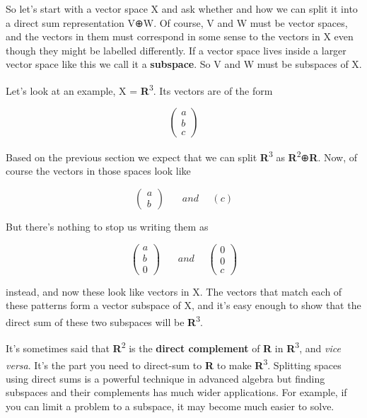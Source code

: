 \documentclass[oneside,english]{amsbook}
\numberwithin{section}{chapter}
\theoremstyle{plain}
\theoremstyle{definition}
\begin{document}
So let's start with a vector space X and ask whether and how we can
split it into a direct sum representation V⊕W. Of course, V and W must
be vector spaces, and the vectors in them must correspond in some sense
to the vectors in X even though they might be labelled differently. If a
vector space lives inside a larger vector space like this we call it a
\textbf{subspace}. So V and W must be subspaces of X.

Let's look at an example, X = \textbf{R}\textsuperscript{3}. Its vectors
are of the form

\[\begin{pmatrix}
	a \\
	b \\
	c
\end{pmatrix}\]

Based on the previous section we expect that we can split
\textbf{R}\textsuperscript{3} as
\textbf{R}\textsuperscript{2}⊕\textbf{R}. Now, of course the vectors in
those spaces look like

\[\begin{pmatrix}
	a \\
	b
\end{pmatrix}\ \ \ \ \ \ \ \ and\ \ \ \ \ \ (c)\]

But there's nothing to stop us writing them as

\[\begin{pmatrix}
	a \\
	b \\
	0
\end{pmatrix}\ \ \ \ \ \ \ \ and\ \ \ \ \ \ \begin{pmatrix}
	0 \\
	0 \\
	c
\end{pmatrix}\]

instead, and now these look like vectors in X. The vectors that match
each of these patterns form a vector subspace of X, and it's easy enough
to show that the direct sum of these two subspaces will be
\textbf{R}\textsuperscript{3}.

It's sometimes said that \textbf{R}\textsuperscript{2} is the
\textbf{direct complement} of \textbf{R} in
\textbf{R}\textsuperscript{3}, and \emph{vice versa}. It's the part you
need to direct-sum to \textbf{R} to make \textbf{R}\textsuperscript{3}.
Splitting spaces using direct sums is a powerful technique in advanced
algebra but finding subspaces and their complements has much wider
applications. For example, if you can limit a problem to a subspace, it
may become much easier to solve.
\end{document}
